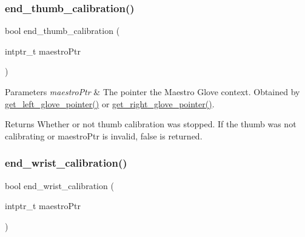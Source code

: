 \subsubsection{\texorpdfstring{end\+\_\+thumb\+\_\+calibration()}{end\_thumb\_calibration()}}
{\footnotesize\ttfamily bool end\+\_\+thumb\+\_\+calibration (\begin{DoxyParamCaption}\item[{intptr\+\_\+t}]{maestro\+Ptr }\end{DoxyParamCaption})}


\begin{DoxyParams}{Parameters}
{\em maestro\+Ptr} & The pointer the Maestro Glove context. Obtained by \hyperlink{group__glove_management_ga63ce3c99d4a8b8db851b22af9185764e}{get\+\_\+left\+\_\+glove\+\_\+pointer()} or \hyperlink{group__glove_management_ga9b8fd9d91aeac3f8da50f7a7eba0c32b}{get\+\_\+right\+\_\+glove\+\_\+pointer()}. \\
\hline
\end{DoxyParams}
\begin{DoxyReturn}{Returns}
Whether or not thumb calibration was stopped. If the thumb was not calibrating or {\ttfamily maestro\+Ptr} is invalid, {\ttfamily false} is returned. 
\end{DoxyReturn}
\mbox{\label{group__glove_calibration_ga4528575643eb59c92277338516679588}} 
\subsubsection{\texorpdfstring{end\+\_\+wrist\+\_\+calibration()}{end\_wrist\_calibration()}}
{\footnotesize\ttfamily bool end\+\_\+wrist\+\_\+calibration (\begin{DoxyParamCaption}\item[{intptr\+\_\+t}]{maestro\+Ptr }\end{DoxyParamCaption})}


